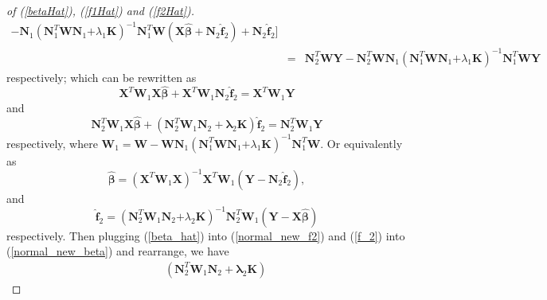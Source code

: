 \documentclass[article,lineno]{biometrika}
\begin{document}
\begin{proof} [of (\ref{betaHat}),  (\ref{f1Hat}) and  (\ref{f2Hat})]
\begin{eqnarray*}
- 
\boldsymbol N_1 
(\boldsymbol N_1^T  \boldsymbol W \boldsymbol N_1 \boldsymbol 
+ \lambda_1 \boldsymbol K)^{-1}
\boldsymbol N_1^T  \boldsymbol W
(\boldsymbol X \boldsymbol {\hat \beta} +  \boldsymbol N_2 \boldsymbol {\hat f}_2)
+  \boldsymbol N_2 \boldsymbol {\hat f}_2
\big] \\
&=&
  \boldsymbol N_2^T  \boldsymbol W
 \boldsymbol Y
  - \boldsymbol N_2^T  \boldsymbol W
  \boldsymbol N_1 
 (\boldsymbol N_1^T  \boldsymbol W \boldsymbol N_1 \boldsymbol 
 + \lambda_1 \boldsymbol K)^{-1}
 \boldsymbol N_1^T  \boldsymbol W \boldsymbol Y
\end{eqnarray*}
respectively; 
which can be rewritten as
\begin{equation} \label{normal_new_beta}
\boldsymbol X^T  \boldsymbol W_1
\boldsymbol X \boldsymbol {\hat \beta} 
+ 
\boldsymbol X^T  \boldsymbol W_1
\boldsymbol N_2 \boldsymbol {\hat f}_2
=
\boldsymbol X^T  \boldsymbol W_1
\boldsymbol Y
\end{equation}
and
\begin{equation} \label{normal_new_f2}
\boldsymbol N_2^T  \boldsymbol W_1
\boldsymbol X \boldsymbol {\hat \beta} 
+ 
(\boldsymbol N_2^T  \boldsymbol W_1
\boldsymbol N_2 + \boldsymbol \lambda_2 \boldsymbol K)
\boldsymbol {\hat f}_2
=
\boldsymbol N_2^T  \boldsymbol W_1
\boldsymbol Y
\end{equation}
respectively,
where 
$\boldsymbol W_1 =
 \boldsymbol W 
 -
\boldsymbol W \boldsymbol N_1 
 (\boldsymbol N_1^T  \boldsymbol W \boldsymbol N_1 \boldsymbol 
 + \lambda_1 \boldsymbol K)^{-1} 
 \boldsymbol N_1^T  \boldsymbol W$.
Or equivalently as 
\begin{equation} \label{beta_hat}
\boldsymbol {\hat \beta} 
= 
(\boldsymbol X^T  \boldsymbol W_1\boldsymbol X)^{-1}  
\boldsymbol X^T  \boldsymbol W_1 (\boldsymbol Y
- \boldsymbol N_2 \boldsymbol {\hat f}_2), 
\end{equation}
and
\begin{equation}   \label{f_2}
\boldsymbol {\hat f}_2 
=  (\boldsymbol N_2^T  \boldsymbol W_1 \boldsymbol N_2 \boldsymbol 
+ \lambda_2 \boldsymbol K)^{-1}
\boldsymbol N_2^T  \boldsymbol W_1 (\boldsymbol Y -\boldsymbol X \boldsymbol {\hat \beta})
\end{equation}
respectively.
Then  plugging (\ref{beta_hat}) into  (\ref{normal_new_f2})
and (\ref{f_2}) into (\ref{normal_new_beta}) and rearrange, we have
\begin{eqnarray*}
&&
(\boldsymbol N_2^T  \boldsymbol W_1
\boldsymbol N_2 + \boldsymbol \lambda_2 \boldsymbol K)

\end{eqnarray*}
\end{proof}
\end{document}
